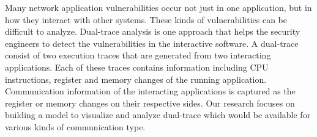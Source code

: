 \label{chapter:introduction}

Many network application vulnerabilities occur not just in one application, but in how they interact with other systems. These kinds of vulnerabilities can be difficult to analyze. Dual-trace analysis is one approach that helps the security engineers to detect the vulnerabilities in the interactive software. A dual-trace consist of two execution traces that are generated from two interacting applications. Each of these traces contains information including CPU instructions, register and memory changes of the running application. Communication information of the interacting applications is captured as the register or memory changes on their respective sides. Our research focuses on building a model to visualize and analyze dual-trace which would be available for various kinds of communication type.
